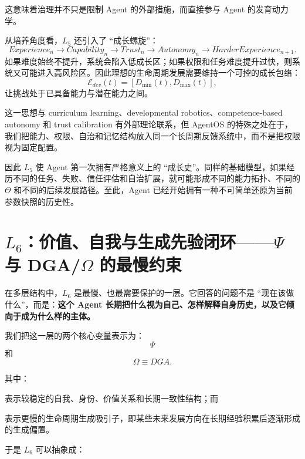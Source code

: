 这意味着治理并不只是限制 Agent 的外部措施，而直接参与 Agent 的发育动力学。

从培养角度看，$L_5$ 还引入了 ``成长螺旋''：
\[
Experience_n
\rightarrow
Capability_n
\rightarrow
Trust_n
\rightarrow
Autonomy_n
\rightarrow
HarderExperience_{n+1}.
\]
如果难度始终不提升，系统会陷入低成长区；如果权限和任务难度提升过快，则系统又可能进入高风险区。因此理想的生命周期发展需要维持一个可控的成长包络：
\[
\mathcal E_{dev}(t)
=
\left[
D_{\min}(t),
D_{\max}(t)
\right],
\]
让挑战处于已具备能力与潜在能力之间。

这一思想与 curriculum learning、developmental robotics、competence-based autonomy 和 trust calibration 有外部理论联系，但 AgentOS 的特殊之处在于，我们把能力、权限、自治和记忆结构放入同一个长周期反馈系统中，而不是把权限视为固定配置。

因此 $L_5$ 使 Agent 第一次拥有严格意义上的 ``成长史''。同样的基础模型，如果经历不同的任务、失败、信任评估和自治扩展，就可能形成不同的能力拓扑、不同的 $\Theta$ 和不同的后续发展路径。至此，Agent 已经开始拥有一种不可简单还原为当前参数快照的历史性。

\section{$L_6$：价值、自我与生成先验闭环——$\Psi$ 与 DGA/$\Omega$ 的最慢约束}

在多层结构中，$L_6$ 是最慢、也最需要保护的一层。它回答的问题不是 ``现在该做什么''，而是：\textbf{这个 Agent 长期把什么视为自己、怎样解释自身历史，以及它倾向于成为什么样的主体。}

我们把这一层的两个核心变量表示为：
\[
\Psi
\]
和
\[
\Omega\equiv DGA.
\]

其中：
\begin{statementbox}
\centering
{}
\end{statementbox}
表示较稳定的自我、身份、价值关系和长期一致性结构；而
\begin{statementbox}
\centering
{}
\end{statementbox}
表示更慢的生命周期生成吸引子，即某些未来发展方向在长期经验积累后逐渐形成的生成偏置。

于是 $L_6$ 可以抽象成：
\begin{statementbox}
\centering
{}
\end{statementbox}

